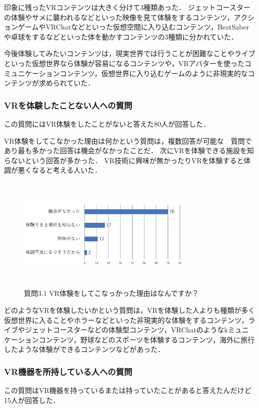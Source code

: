 \documentclass[12pt,a4j]{ltjsarticle}
\begin{document}
印象に残ったVRコンテンツは大きく分けて3種類あった．
ジェットコースターの体験やサメに襲われるなどといった映像を見て体験をするコンテンツ，アクションゲームやVRChatなどといった仮想空間に入り込むコンテンツ，BeatSaberや卓球をするなどといった体を動かすコンテンツの3種類に分かれていた．

今後体験してみたいコンテンツは，現実世界では行うことが困難なことやライブといった仮想世界なら体験が容易になるコンテンツや，VRアバターを使ったコミュニケーションコンテンツ，仮想世界に入り込むゲームのように非現実的なコンテンツが求められていた．

\subsubsection{VRを体験したことない人への質問}
この質問にはVR体験をしたことがないと答えた80人が回答した．

VR体験をしてこなかった理由は何かという質問は，複数回答が可能な　質問であり最も多かった回答は機会がなかったことだ．
次にVRを体験できる施設を知らないという回答が多かった．
VR技術に興味が無かったりVRを体験すると体調が悪くなると考える人いた．

\begin{figure}[h]
\begin{center}
 \includegraphics[clip,width=85mm,height=55mm]{アンケート結果1_3_1.pdf}
\end{center}
 \caption{質問3.1 VR体験をしてこなっかった理由はなんですか？}
 \label{fig:アンケート結果1_3_1.pdf}
\end{figure}

どのようなVRを体験したいかという質問は，VRを体験した人よりも種類が多く仮想世界に入ることやホラーなどといった非現実的な体験をするコンテンツ，ライブやジェットコースターなどの体験型コンテンツ，VRChatのようなkミュニケーションコンテンツ，野球などのスポーツを体験するコンテンツ，海外に旅行したような体験ができるコンテンツなどがあった．

\subsubsection{VR機器を所持している人への質問}
この質問はVR機器を持っているまたは持っていたことがあると答えたんだけど15人が回答した．
\end{document}
